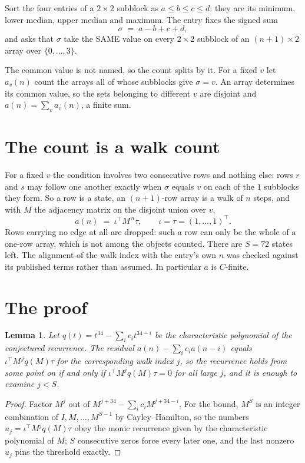 \documentclass[11pt,a4paper]{article}
\theoremstyle{plain}
\newtheorem{lemma}[theorem]{Lemma}
\theoremstyle{definition}
\begin{document}
Sort the four entries of a $2\times2$ subblock as $a\le b\le c\le d$: they
are its minimum, lower median, upper median and maximum. The entry fixes the signed sum
\[
\sigma\;=\;a-b+c+d,
\]
and asks that $\sigma$ take the SAME value on every $2\times2$ subblock of an
$(n+1)\times2$ array over $\{0,\dots,3\}$.

The common value is not named, so the count splits by it. For a fixed $v$ let $a_v(n)$ count
the arrays all of whose subblocks give $\sigma=v$. An array determines its common value, so
the sets belonging to different $v$ are disjoint and $a(n)=\sum_v a_v(n)$, a finite sum.


\section{The count is a walk count}

For a fixed $v$ the condition involves two consecutive rows and nothing
else: rows $r$ and $s$ may follow one another exactly when $\sigma$ equals $v$ on each of the
$1$ subblocks they form. So a row is a state, an $(n+1)$-row array is a walk of $n$
steps, and with $M$ the adjacency matrix on the disjoint union over $v$,
\[
a(n)\;=\;\iota^{\!\top}M^{\,n}\tau,\qquad\iota=\tau=(1,\dots,1)^{\!\top} .
\]
Rows carrying no edge at all are dropped: such a row can only be the whole of a one-row
array, which is not among the objects counted. There are $S=72$ states left.
The alignment of the walk index with the entry's own $n$ was checked against its published
terms rather than assumed. In particular $a$ is $C$-finite.

\section{The proof}

\begin{lemma}\label{lem:crit}
Let $q(t)=t^{34}-\sum_i c_it^{34-i}$ be the characteristic polynomial of the
conjectured recurrence. The residual $a(n)-\sum_ic_ia(n-i)$ equals
$\iota^{\!\top}M^{\,j}q(M)\tau$ for the corresponding walk index $j$, so the recurrence
holds from some point on if and only if $\iota^{\!\top}M^{j}q(M)\tau=0$ for all large $j$,
and it is enough to examine $j<S$.
\end{lemma}

\begin{proof}
Factor $M^{j}$ out of $M^{j+34}-\sum_ic_iM^{j+34-i}$. For the bound, $M^{S}$
is an integer combination of $I,M,\dots,M^{S-1}$ by Cayley--Hamilton, so the numbers
$u_j=\iota^{\!\top}M^{j}q(M)\tau$ obey the monic recurrence given by the characteristic
polynomial of $M$; $S$ consecutive zeros force every later one, and the last nonzero $u_j$
pins the threshold exactly.
\end{proof}
\end{document}
